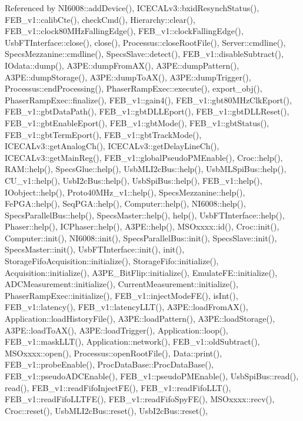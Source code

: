 Referenced by N\+I6008\+::add\+Device(), I\+C\+E\+C\+A\+Lv3\+::bxid\+Resynch\+Status(), F\+E\+B\+\_\+v1\+::calib\+Cte(), check\+Cmd(), Hierarchy\+::clear(), F\+E\+B\+\_\+v1\+::clock80\+M\+Hz\+Falling\+Edge(), F\+E\+B\+\_\+v1\+::clock\+Falling\+Edge(), Usb\+F\+T\+Interface\+::close(), close(), Processus\+::close\+Root\+File(), Server\+::cmdline(), Specs\+Mezzanine\+::cmdline(), Specs\+Slave\+::detect(), F\+E\+B\+\_\+v1\+::disable\+Subtract(), I\+Odata\+::dump(), A3\+P\+E\+::dump\+From\+A\+X(), A3\+P\+E\+::dump\+Pattern(), A3\+P\+E\+::dump\+Storage(), A3\+P\+E\+::dump\+To\+A\+X(), A3\+P\+E\+::dump\+Trigger(), Processus\+::end\+Processing(), Phaser\+Ramp\+Exec\+::execute(), export\+\_\+obj(), Phaser\+Ramp\+Exec\+::finalize(), F\+E\+B\+\_\+v1\+::gain4(), F\+E\+B\+\_\+v1\+::gbt80\+M\+Hz\+Clk\+Eport(), F\+E\+B\+\_\+v1\+::gbt\+Data\+Path(), F\+E\+B\+\_\+v1\+::gbt\+D\+L\+L\+Eport(), F\+E\+B\+\_\+v1\+::gbt\+D\+L\+L\+Reset(), F\+E\+B\+\_\+v1\+::gbt\+Enable\+Eport(), F\+E\+B\+\_\+v1\+::gbt\+Mode(), F\+E\+B\+\_\+v1\+::gbt\+Status(), F\+E\+B\+\_\+v1\+::gbt\+Term\+Eport(), F\+E\+B\+\_\+v1\+::gbt\+Track\+Mode(), I\+C\+E\+C\+A\+Lv3\+::get\+Analog\+Ch(), I\+C\+E\+C\+A\+Lv3\+::get\+Delay\+Line\+Ch(), I\+C\+E\+C\+A\+Lv3\+::get\+Main\+Reg(), F\+E\+B\+\_\+v1\+::global\+Pseudo\+P\+M\+Enable(), Croc\+::help(), R\+A\+M\+::help(), Specs\+Glue\+::help(), Usb\+M\+L\+I2c\+Bus\+::help(), Usb\+M\+L\+Spi\+Bus\+::help(), C\+U\+\_\+v1\+::help(), Usb\+I2c\+Bus\+::help(), Usb\+Spi\+Bus\+::help(), F\+E\+B\+\_\+v1\+::help(), I\+Oobject\+::help(), Proto40\+M\+Hz\+\_\+v1\+::help(), Specs\+Mezzanine\+::help(), Fe\+P\+G\+A\+::help(), Seq\+P\+G\+A\+::help(), Computer\+::help(), N\+I6008\+::help(), Specs\+Parallel\+Bus\+::help(), Specs\+Master\+::help(), help(), Usb\+F\+T\+Interface\+::help(), Phaser\+::help(), I\+C\+Phaser\+::help(), A3\+P\+E\+::help(), M\+S\+Oxxxx\+::id(), Croc\+::init(), Computer\+::init(), N\+I6008\+::init(), Specs\+Parallel\+Bus\+::init(), Specs\+Slave\+::init(), Specs\+Master\+::init(), Usb\+F\+T\+Interface\+::init(), init(), Storage\+Fifo\+Acquisition\+::initialize(), Storage\+Fifo\+::initialize(), Acquisition\+::initialize(), A3\+P\+E\+\_\+\+Bit\+Flip\+::initialize(), Emulate\+F\+E\+::initialize(), A\+D\+C\+Measurement\+::initialize(), Current\+Measurement\+::initialize(), Phaser\+Ramp\+Exec\+::initialize(), F\+E\+B\+\_\+v1\+::inject\+Mode\+F\+E(), is\+Int(), F\+E\+B\+\_\+v1\+::latency(), F\+E\+B\+\_\+v1\+::latency\+L\+L\+T(), A3\+P\+E\+::load\+From\+A\+X(), Application\+::load\+History\+File(), A3\+P\+E\+::load\+Pattern(), A3\+P\+E\+::load\+Storage(), A3\+P\+E\+::load\+To\+A\+X(), A3\+P\+E\+::load\+Trigger(), Application\+::loop(), F\+E\+B\+\_\+v1\+::mask\+L\+L\+T(), Application\+::network(), F\+E\+B\+\_\+v1\+::old\+Subtract(), M\+S\+Oxxxx\+::open(), Processus\+::open\+Root\+File(), Data\+::print(), F\+E\+B\+\_\+v1\+::probe\+Enable(), Proc\+Data\+Base\+::\+Proc\+Data\+Base(), F\+E\+B\+\_\+v1\+::pseudo\+A\+D\+C\+Enable(), F\+E\+B\+\_\+v1\+::pseudo\+P\+M\+Enable(), Usb\+Spi\+Bus\+::read(), read(), F\+E\+B\+\_\+v1\+::read\+Fifo\+Inject\+F\+E(), F\+E\+B\+\_\+v1\+::read\+Fifo\+L\+L\+T(), F\+E\+B\+\_\+v1\+::read\+Fifo\+L\+L\+T\+F\+E(), F\+E\+B\+\_\+v1\+::read\+Fifo\+Spy\+F\+E(), M\+S\+Oxxxx\+::recv(), Croc\+::reset(), Usb\+M\+L\+I2c\+Bus\+::reset(), Usb\+I2c\+Bus\+::reset(), 